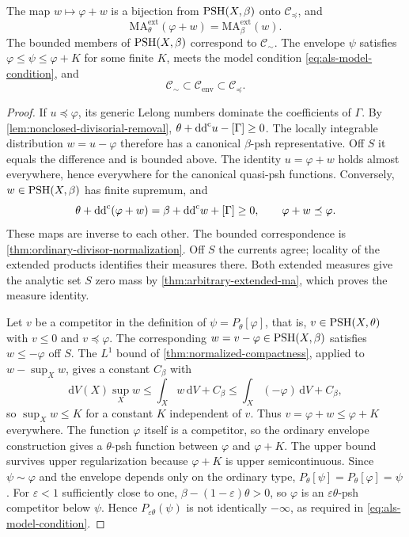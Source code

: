 \begin{lemma}\label{lem:one-sided-divisor-correspondence}
The map $w\mapsto\varphi+w$ is a bijection from $\mathrm{PSH}(X,\beta)$ onto $\mathcal C_{\preceq}$, and
\[
 \mathrm{MA}^{\mathrm{ext}}_\theta(\varphi+w)
                         =\mathrm{MA}^{\mathrm{ext}}_\beta(w).
\]
The bounded members of $\mathrm{PSH}(X,\beta)$ correspond to $\mathcal C_{\sim}$. The envelope $\psi$ satisfies $\varphi\le\psi\le\varphi+K$ for some finite $K$, meets the model condition \eqref{eq:als-model-condition}, and
\[
 \mathcal C_{\sim}\subset\mathcal C_{\mathrm{env}}
                         \subset\mathcal C_{\preceq}.
\]
\end{lemma}
\begin{proof}
If $u\preceq\varphi$, its generic Lelong numbers dominate the coefficients of $\Gamma$. By \cref{lem:nonclosed-divisorial-removal},
$\theta+\mathrm{dd}^{\mathrm{c}} u-[\Gamma]\ge0$. The locally integrable distribution $w=u-\varphi$ therefore has a canonical $\beta$-psh representative. Off $S$ it equals the difference and is bounded above. The identity $u=\varphi+w$ holds almost everywhere, hence everywhere for the canonical quasi-psh functions. Conversely, $w\in\mathrm{PSH}(X,\beta)$ has finite supremum, and
\[
 \theta+\mathrm{dd}^{\mathrm{c}}(\varphi+w)=\beta+\mathrm{dd}^{\mathrm{c}} w+[\Gamma]\ge0,
 \qquad \varphi+w\preceq\varphi.
\]
These maps are inverse to each other. The bounded correspondence is \cref{thm:ordinary-divisor-normalization}. Off $S$ the currents agree; locality of the extended products identifies their measures there. Both extended measures give the analytic set $S$ zero mass by \cref{thm:arbitrary-extended-ma}, which proves the measure identity.

Let $v$ be a competitor in the definition of $\psi=P_\theta[\varphi]$, that is, $v\in\mathrm{PSH}(X,\theta)$ with $v\le0$ and $v\preceq\varphi$. The corresponding $w=v-\varphi\in\mathrm{PSH}(X,\beta)$ satisfies $w\le-\varphi$ off $S$. The $L^1$ bound of \cref{thm:normalized-compactness}, applied to $w-\sup_Xw$, gives a constant $C_\beta$ with
\[
 \mathrm dV(X)\sup_Xw\le\int_Xw\,\mathrm dV+C_\beta
                  \le\int_X(-\varphi)\,\mathrm dV+C_\beta,
\]
so $\sup_Xw\le K$ for a constant $K$ independent of $v$.
Thus $v=\varphi+w\le\varphi+K$ everywhere. The function $\varphi$ itself is a competitor, so the ordinary envelope construction gives a $\theta$-psh function between $\varphi$ and $\varphi+K$. The upper bound survives upper regularization because $\varphi+K$ is upper semicontinuous. Since $\psi\sim\varphi$ and the envelope depends only on the ordinary type, $P_\theta[\psi]=P_\theta[\varphi]=\psi$. For $\varepsilon<1$ sufficiently close to one, $\beta-(1-\varepsilon)\theta>0$, so $\varphi$ is an $\varepsilon\theta$-psh competitor below $\psi$. Hence $P_{\varepsilon\theta}(\psi)$ is not identically $-\infty$, as required in \eqref{eq:als-model-condition}.


\end{proof}
